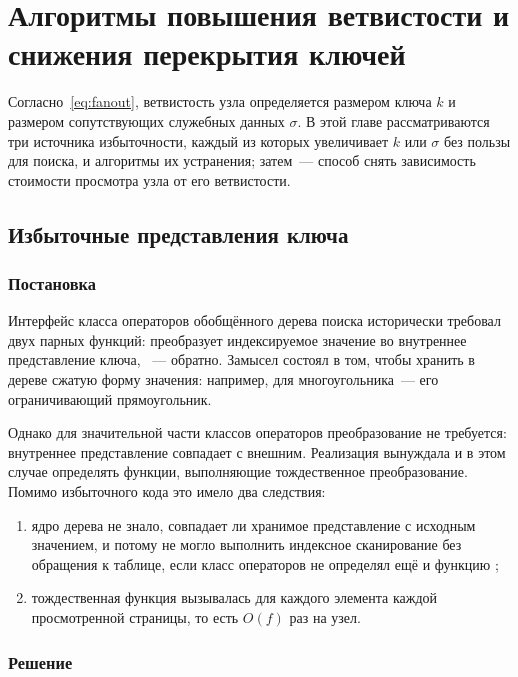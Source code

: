 \chapter{Алгоритмы повышения ветвистости и снижения перекрытия ключей}
\label{ch:fanout}

Согласно~\eqref{eq:fanout}, ветвистость узла определяется размером ключа $k$ и
размером сопутствующих служебных данных $\sigma$. В этой главе рассматриваются
три источника избыточности, каждый из которых увеличивает $k$ или $\sigma$ без
пользы для поиска, и алгоритмы их устранения; затем~--- способ снять
зависимость стоимости просмотра узла от его ветвистости.

\section{Избыточные представления ключа}
\label{sec:compress}

\subsection{Постановка}

Интерфейс класса операторов обобщённого дерева поиска исторически требовал двух
парных функций:  преобразует индексируемое значение во
внутреннее представление ключа, ~--- обратно. Замысел состоял
в том, чтобы хранить в дереве сжатую форму значения: например, для многоугольника~---
его ограничивающий прямоугольник.

Однако для значительной части классов операторов преобразование не требуется:
внутреннее представление совпадает с внешним. Реализация вынуждала и в этом
случае определять функции, выполняющие тождественное преобразование. Помимо
избыточного кода это имело два следствия:

\begin{enumerate}
\item ядро дерева не знало, совпадает ли хранимое представление с исходным
      значением, и потому не могло выполнить индексное сканирование без
      обращения к таблице, если класс операторов не определял ещё и функцию
      ;
\item тождественная функция  вызывалась для каждого элемента
      каждой просмотренной страницы, то есть $O(f)$ раз на узел.
\end{enumerate}

\subsection{Решение}


